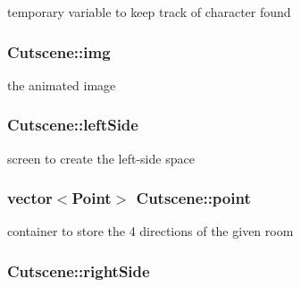 temporary variable to keep track of character found 

\hypertarget{classCutscene_ae40582568add2f44e099d4a8978f41d4}{
\subsubsection[{img}]{ Cutscene\-::img\hspace{0.3cm}{\ttfamily [private]}}}\label{classCutscene_ae40582568add2f44e099d4a8978f41d4}


the animated image 

\hypertarget{classCutscene_aac25c81316f03b3c3caf0bdf735926bc}{
\subsubsection[{left\-Side}]{ Cutscene\-::left\-Side\hspace{0.3cm}{\ttfamily [private]}}}\label{classCutscene_aac25c81316f03b3c3caf0bdf735926bc}


screen to create the left-\/side space 

\hypertarget{classCutscene_a7438465af0e7bc51d52ca5aaefc97e3b}{
\subsubsection[{point}]{\setlength{\rightskip}{0pt plus 5cm}vector$<${\bf Point}$>$ Cutscene\-::point\hspace{0.3cm}{\ttfamily [private]}}}\label{classCutscene_a7438465af0e7bc51d52ca5aaefc97e3b}


container to store the 4 directions of the given room 

\hypertarget{classCutscene_ac8cc850025b847d951e74418b757d62c}{
\subsubsection[{right\-Side}]{ Cutscene\-::right\-Side\hspace{0.3cm}{\ttfamily [private]}}}\label{classCutscene_ac8cc850025b847d951e74418b757d62c}


